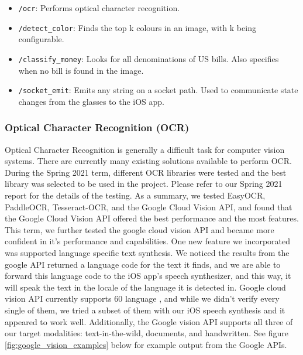 \documentclass[a4paper,11pt]{article}
\begin{document}
\begin{itemize}
    \item \texttt{/ocr}: Performs optical character recognition.
    \item \texttt{/detect\_color}: Finds the top k colours in an image, with k being configurable.
    \item \texttt{/classify\_money}: Looks for all denominations of US bills. Also specifies when no bill is found in the image.
    \item \texttt{/socket\_emit}: Emits any string on a socket path. Used to communicate state changes from the glasses to the iOS app.
\end{itemize}

\subsubsection{Optical Character Recognition (OCR)}
Optical Character Recognition is generally a difficult task for computer vision systems. There are currently many existing solutions available to perform OCR. During the Spring 2021 term, different OCR libraries were tested and the best library was selected to be used in the project. Please refer to our Spring 2021 report for the details of the testing. As a summary, we tested EasyOCR, PaddleOCR, Tesseract-OCR, and the Google Cloud Vision API, and found that the Google Cloud Vision API offered the best performance and the most features. This term, we further tested the google cloud vision API and became more confident in it's performance and capabilities. One new feature we incorporated was supported language specific text synthesis. We noticed the results from the google API returned a language code for the text it finds, and we are able to forward this language code to the iOS app's speech synthesizer, and this way, it will speak the text in the locale of the language it is detected in. Google cloud vision API currently supports 60 language \cite{google-languages}, and while we didn't verify every single of them, we tried a subset of them with our iOS speech synthesis and it appeared to work well. Additionally, the Google vision API supports all three of our target modalities: text-in-the-wild, documents, and handwritten. See figure \ref{fig:google_vision_examples} below for example output from the Google APIs.
\end{document}
